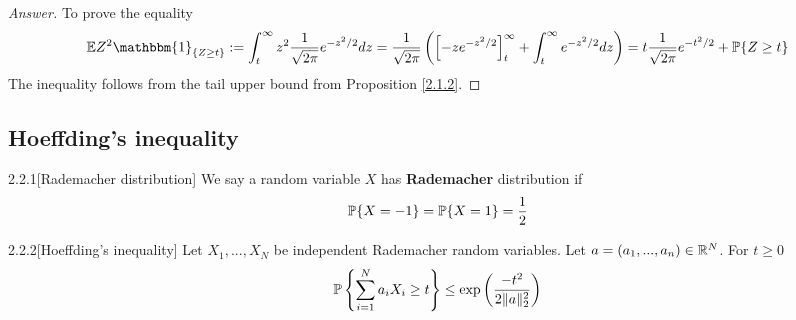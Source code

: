 {\begin{proof}[Answer]
To prove the equality
\begin{align*}
    \E Z^2 \mathbbm{1}_{\{Z\geq t\}} := \int^\infty_t z^2 \frac 1 {\sqrt{2\pi}}e^{-z^2/2} dz = \frac 1 {\sqrt{2\pi}}\l(\l[-ze^{-z^2/2}\r]^\infty_t + \int^\infty_t e^{-z^2/2} dz\r) 
    =t\frac1{\sqrt{2\pi}}e^{-t^2/2} + \P\{Z \geq t\}
\end{align*}
The inequality follows from the tail upper bound from Proposition \ref{2.1.2}.
\end{proof}
\subsection{Hoeffding's inequality}

\begin{defn}{2.2.1}[Rademacher distribution]\label{2.2.1} We say a random variable $X$ has \textbf{Rademacher} distribution if
\begin{align*}
    \P\{X = -1\} = \P\{X = 1\} = \frac 1 2
\end{align*}
\end{defn}

\begin{thm}{2.2.2}[Hoeffding's inequality] \label{2.2.2}
Let $X_1,...,X_N$ be independent Rademacher random variables. Let $a = (a_1,...,a_n) \in \R^N$. For $t\geq 0$
\begin{align*}
\P \l\{\sum_{i=1}^N a_i X_i \geq t\r\} \leq \exp\l( \frac {-t^2}{2\|a\|^2_2}\r)
\end{align*}
\end{thm}

}
